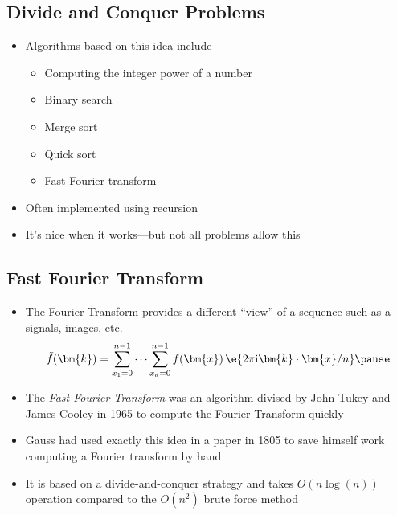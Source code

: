 
\begin{slide}
\section[-1]{Divide and Conquer Problems}

\begin{PauseHighLight}
  \begin{itemize}
  \item Algorithms based on this idea include
    \begin{itemize}
    \item Computing the integer power of a number
    \item Binary search
    \item Merge sort
    \item Quick sort
    \item Fast Fourier transform\pause
    \end{itemize}
  \item Often implemented using recursion\pause
  \item It's nice when it works---but not all problems allow this\pause
  \end{itemize}
\end{PauseHighLight}

\end{slide}


\begin{slide}
\section[-2]{Fast Fourier Transform}

\begin{PauseHighLight}
  \begin{itemize}
  \item The Fourier Transform provides a different ``view'' of a
    sequence such as a signals, images, etc.
    \begin{align*}
      \tilde{f}(\bm{k}) = \sum_{x_1=0}^{n-1}\cdots \sum_{x_d=0}^{n-1} f(\bm{x})\,\e{2\pi\mathrm{i}
        \bm{k}\cdot\bm{x}/n}\pause
    \end{align*}
  \item The \emph{Fast Fourier Transform} was an algorithm divised by
    John Tukey and James Cooley in 1965 to compute the Fourier
    Transform quickly\pause
  \item Gauss had used exactly this idea in a paper in 1805 to save
    himself work computing a Fourier transform by hand\pause
  \item It is based on a divide-and-conquer strategy and takes
    $O(n\log(n))$ operation compared to the $O(n^2)$ brute force
    method\pause
  \end{itemize}
\end{PauseHighLight}

\end{slide}


